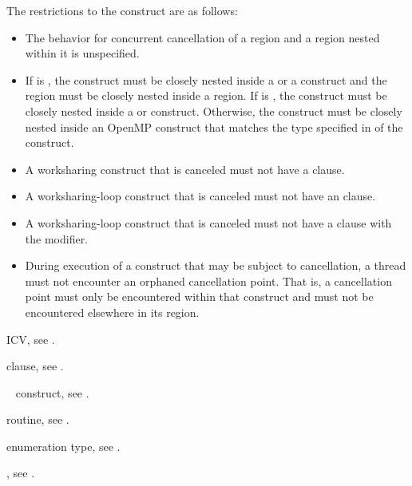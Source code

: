 \restrictions
The restrictions to the  construct are as follows:

\begin{itemize}
\item The behavior for concurrent cancellation of a region and a region nested 
      within it is unspecified.
\item If  is , the 
      construct must be closely nested inside a  or a  construct and the
       region must be closely nested inside a  
      region. If  is , the 
       construct must be closely nested inside a  
      or  construct. Otherwise, the  construct must 
      be closely nested inside an OpenMP construct that matches the type 
      specified in  of the  construct.
\item A worksharing construct that is canceled must not have a  clause.
\item A worksharing-loop construct that is canceled must not have an 
       clause.
\item A worksharing-loop construct that is canceled must not have a 
      clause with the  modifier.
\item During execution of a construct that may be subject to cancellation, a
      thread must not encounter an orphaned cancellation point. That is, a
      cancellation point must only be encountered within that construct and must
      not be encountered elsewhere in its region.
\end{itemize}

\begin{crossrefs}
\item {} ICV, see
.

\item {} clause, see .

\item {}~ construct, see
.

\item {} routine, see
.

\item {} enumeration type, see .

\item {}, see .
\end{crossrefs}



